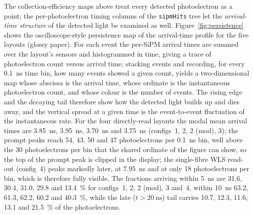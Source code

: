 \documentclass[11pt,a4paper]{article}
\begin{document}
The collection-efficiency maps above treat every detected photoelectron as a
point; the per-photoelectron timing columns of the \texttt{sipmHits} tree
let the \emph{arrival-time structure} of the detected light be examined as well.
Figure~\ref{fig:persistence} shows the oscilloscope-style persistence map of the
arrival-time profile for the five layouts (glossy paper). For each event the
per-SiPM arrival times are summed over the layout's sensors and histogrammed in
time, giving a trace of photoelectron count versus arrival time; stacking events
and recording, for every \SI{0.1}{\nano\second} time bin, how many events showed
a given count, yields a two-dimensional map whose abscissa is the arrival time, whose
ordinate is the instantaneous photoelectron count, and whose colour is the number
of events. The rising edge and the decaying tail therefore show how the detected
light builds up and dies away, and the vertical spread at a given time is the
event-to-event fluctuation of the instantaneous rate. For the four directly-read
layouts the modal mean arrival times are \SI{3.85}{\nano\second},
\SI{3.95}{\nano\second}, \SI{3.70}{\nano\second} and
\SI{3.75}{\nano\second} (configs~1, 2, 2 (mod), 3); the prompt peaks reach
\num{54}, \num{43}, \num{50} and \num{47} photoelectrons per
\SI{0.1}{\nano\second} bin, well above the \num{30} photoelectrons per bin that
the shared ordinate of the figure can show, so the top of the prompt peak is
clipped in the display; the single-fibre WLS read-out (config~4) peaks markedly
later, at \SI{7.95}{\nano\second} and at only \num{18} photoelectrons per bin,
which is therefore fully visible. The fractions arriving within
\SI{5}{\nano\second} are \num{31.6}, \num{30.4}, \num{31.0}, \num{29.8} and
\SI{13.4}{\percent} for configs~1, 2, 2 (mod), 3 and~4, within
\SI{10}{\nano\second} \num{63.2}, \num{61.3}, \num{62.2}, \num{60.2} and
\SI{40.3}{\percent}, while the late ($t>\SI{20}{\nano\second}$) tail carries
\num{10.7}, \num{12.3}, \num{11.6}, \num{13.1} and \SI{21.5}{\percent} of the
photoelectrons.
\end{document}
